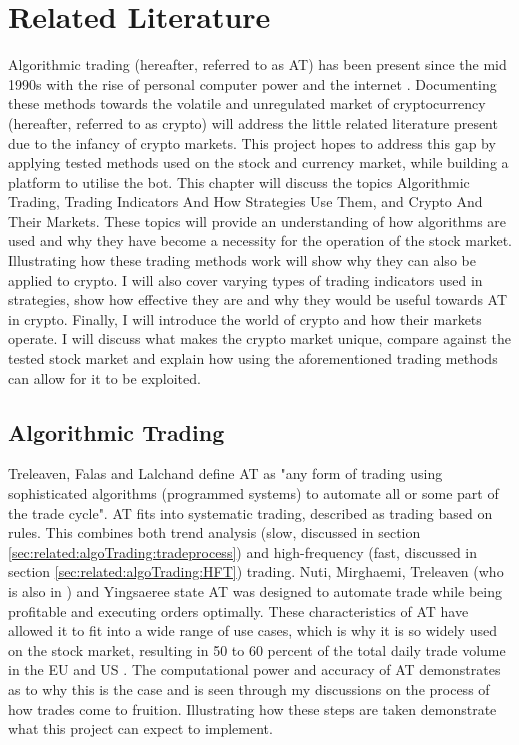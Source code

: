 %
\chapter{Related Literature}
\label{sec:related}
Algorithmic trading (hereafter, referred to as AT) has been present since the mid 1990s with the rise of personal computer power and the internet \cite{WEB:PISANI:2010}. Documenting these methods towards the volatile and unregulated market of cryptocurrency (hereafter, referred to as crypto) will address the little related literature present due to the infancy of crypto markets. This project hopes to address this gap by applying tested methods used on the stock and currency market, while building a platform to utilise the bot. This chapter will discuss the topics Algorithmic Trading, Trading Indicators And How Strategies Use Them, and Crypto And Their Markets. These topics will provide an understanding of how algorithms are used and why they have become a necessity for the operation of the stock market. Illustrating how these trading methods work will show why they can also be applied to crypto. I will also cover varying types of trading indicators used in strategies, show how effective they are and why they would be useful towards AT in crypto. Finally, I will introduce the world of crypto and how their markets operate. I will discuss what makes the crypto market unique, compare against the tested stock market and explain how using the aforementioned trading methods can allow for it to be exploited. 


\section{Algorithmic Trading}
\label{sec:related:algoTrading}
\noindent Treleaven, Falas and Lalchand \cite{ART:Treleaven:2013} define AT as "any form of trading using sophisticated algorithms (programmed systems) to automate all or some part of the trade cycle". AT fits into systematic trading, described as trading based on rules. This combines both trend analysis (slow, discussed in section \ref{sec:related:algoTrading:tradeprocess}) and high-frequency (fast, discussed in section \ref{sec:related:algoTrading:HFT}) trading. Nuti, Mirghaemi, Treleaven (who is also in \cite{ART:Treleaven:2013}) and Yingsaeree \cite{ART:Nuti:2011} state AT was designed to automate trade while being profitable and executing orders optimally. These characteristics of AT have allowed it to fit into a wide range of use cases, which is why it is so widely used on the stock market, resulting in 50 to 60 percent of the total daily trade volume in the EU and US \cite{ART:Nuti:2011}. The computational power and accuracy of AT demonstrates as to why this is the case and is seen through my discussions on the process of how trades come to fruition. Illustrating how these steps are taken demonstrate what this project can expect to implement.

